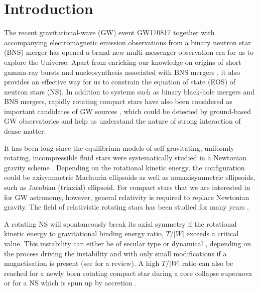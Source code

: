 \documentclass[twocolumn,superscriptaddress,showpacs,prd,aps,amsmath,amssymb,nofootinbib]{revtex4-1}
\begin{document}
\maketitle

\section{Introduction}

The recent gravitational-wave (GW) event GW170817 together with
accompanying electromagnetic emission observations
\cite{Abbott2017,Abbott2017b} from a binary neutron star (BNS) merger has
opened a brand new multi-messenger observation era for us to explore the
Universe. Apart from enriching our knowledge on origins of short
gamma-ray bursts \cite{Abbott2017d} and nucleosynthesis
associated with BNS mergers \cite{Abbott2017c, Baiotti2016}, it also
provides an effective way for us to constrain the equation of state (EOS)
of neutron stars (NS).  In addition to systems such as binary black-hole
mergers and BNS mergers, rapidly rotating compact stars have also been
considered as important candidates of GW sources
\cite{Andersson:2009yt}, which could be detected by ground-based GW
observatories \cite{Abramovici92, Punturo:2010, Accadia2011_etal,
  Kuroda2010, Aso:2013} and help us understand the nature of strong
interaction of dense matter.

It has been long since the equilibrium models of self-gravitating,
uniformly rotating, incompressible fluid stars were
systematically studied in a Newtonian gravity scheme
\cite{Chandrasekhar1969book}. Depending on the rotational kinetic energy,
the configuration could be axisymmetric Maclaurin ellipsoids as well as
nonaxisymmetric ellipsoids, such as Jacobian (triaxial) ellipsoid. For
compact stars that we are interested in for GW astronomy, however,
general relativity is required to replace Newtonian gravity. The field of
relativistic rotating stars has been studied for many years
\cite{Meinel:2008,Friedman2012}.

A rotating NS will spontaneously break its axial symmetry if the
rotational kinetic energy to gravitational binding energy ratio, $T/|W|$
exceeds a critical value. This instability can either be of secular type
\cite{shapiro98b, Bonazzola1996b, rosinska2002, Bonazzola1998c} or
dynamical \cite{Houser96, Pickett96, brown2000, New2000, Liu02,
  Watts:2003nn, Baiotti06b, Manca07, Corvino:2010}, depending on the
process driving the instability and with only small modifications if a
magnetisation is present \cite{Camarda:2009mk, Franci2013,
  Muhlberger2014} (see \cite{Andersson03} for a review). A high $T/|W|$
ratio can also be reached for a newly born rotating compact star during a
core collapse supernova or for a NS which is spun up by accretion
\cite{Lai95, Bildsten98, woosley2005, watts2008, piro2012b}.
\end{document}
